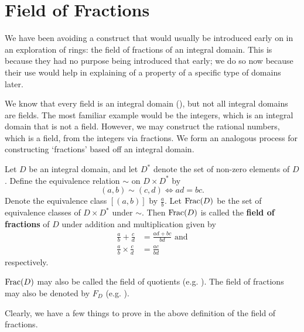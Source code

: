 \section{Field of Fractions}
We have been avoiding a construct that would usually be introduced early on in an exploration of rings: the field of fractions of an integral domain. This is because they had no purpose being introduced that early; we do so now because their use would help in explaining of a property of a specific type of domains later.

We know that every field is an integral domain (), but not all integral domains are fields. The most familiar example would be the integers, which is an integral domain that is not a field. However, we may construct the rational numbers, which is a field, from the integers via fractions. We form an analogous process for constructing `fractions' based off an integral domain.

\begin{definition}\label{definition-field-of-fractions}
    Let $D$ be an integral domain, and let $D^\ast$ denote the set of non-zero elements of $D$. Define the equivalence relation $\sim$ on $D \times D^\ast$ by
    \[
        (a,b) \mathrel{\sim} (c,d) \iff ad = bc.
    \]
    Denote the equivalence class $[(a, b)]$ by $\frac ab$. Let $\mathrm{Frac}(D)$ be the set of equivalence classes of $D \times D^\ast$ under $\sim$. Then $\mathrm{Frac}(D)$ is called the \textbf{field of fractions} of $D$ under addition and multiplication given by
    \begin{align*}
        \frac ab + \frac cd &= \frac{ad+bc}{bd} \text{ and}\\
        \frac ab \times \frac cd &= \frac{ac}{bd}
    \end{align*}
    respectively.
\end{definition}
\begin{remark}
    $\mathrm{Frac}(D)$ may also be called the field of quotients (e.g. \cite[p.~269]{gallian_2016}). The field of fractions may also be denoted by $F_D$ (e.g. \cite[p.~226]{judson_beezer_2022}).
\end{remark}

Clearly, we have a few things to prove in the above definition of the field of fractions.

